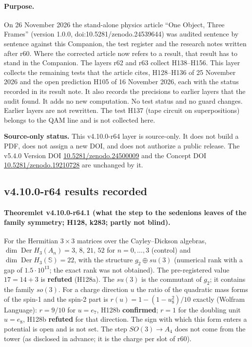\paragraph{Purpose.}
On 26 November 2026 the stand-alone physics article ``One Object, Three Frames'' (version 1.0.0, doi:10.5281/zenodo.24539644) was audited
sentence by sentence against this Companion, the test register and the research notes written after r60.  Where the corrected article now
refers to a result, that result has to stand in the Companion.  The layers r62 and r63 collect H138--H156.  This layer collects the remaining
tests that the article cites, H128--H136 of 25 November 2026 and the open prediction H105 of 16 November 2026, each with the status recorded in
its result note.  It also records the precisions to earlier layers that the audit found.  It adds no new computation.  No test status and no
guard changes.  Earlier layers are not rewritten.  The test H137 (tape circuit on superpositions) belongs to the QAM line and is not collected here.

\noindent\textbf{Source-only status.}
This v4.10.0-r64 layer is source-only.  It does not build a PDF, does not assign a new DOI,
and does not authorize a public release.  The v5.4.0 Version DOI
\href{https://doi.org/10.5281/zenodo.24500009}{10.5281/zenodo.24500009} and the Concept DOI
\href{https://doi.org/10.5281/zenodo.19210728}{10.5281/zenodo.19210728} are unchanged by it.

\subsection*{v4.10.0-r64 results recorded}
\label{subsec:v4100-r64-results}

\paragraph{Theoremlet v4.10.0-r64.1 (what the step to the sedenions leaves of the family symmetry; H128, k283; partly not blind).}
For the Hermitian \(3\times3\) matrices over the Cayley--Dickson algebras, \(\dim\operatorname{Der}H_3(A_n)=3,\,8,\,21,\,52\) for
\(n=0,\dots,3\) (control) and \(\dim\operatorname{Der}H_3(\mathbb S)=22\), with the structure \(g_2\oplus su(3)\) (numerical rank with a gap of
\(1.5\cdot10^{13}\); the exact rank was not obtained).  The pre-registered value \(17=14+3\) is \textbf{refuted} (H128a).  The \(su(3)\) is the
commutant of \(g_2\); it contains the family \(so(3)\).  For a charge direction \(u\) the ratio of the quadratic mass forms of the spin-1 and the
spin-2 part is \(r(u)=1-(1-u_8^2)/10\) exactly (Wolfram Language): \(r=9/10\) for \(u=e_7\), H128b \textbf{confirmed}; \(r=1\) for the doubling
unit \(u=e_8\), H128b \textbf{refuted} for that direction.  The sign with which this form enters a potential is open and is not set.  The step
\(SO(3)\to A_4\) does not come from the tower (as disclosed in advance; it is the charge per slot of r60).

